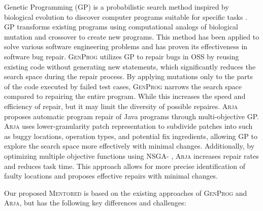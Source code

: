 \documentclass[10pt,conference]{IEEEtran}
\begin{document}
        Genetic Programming (GP) is a probabilistic search method inspired by biological evolution to discover computer programs suitable for specific tasks \cite{forrest1993genetic, koza1992programming}. GP transforms existing programs using computational analogs of biological mutation and crossover to create new programs. This method has been applied to solve various software engineering problems and has proven its effectiveness in software bug repair. \textsc{GenProg} \cite{le2011genprog} utilizes GP to repair bugs in OSS by reusing existing code without generating new statements, which significantly reduces the search space during the repair process. By applying mutations only to the parts of the code executed by failed test cases, \textsc{GenProg} narrows the search space compared to repairing the entire program. While this increases the speed and efficiency of repair, but it may limit the diversity of possible repaires. \textsc{Arja} \cite{yuan2018arja} proposes automatic program repair of Java programs through multi-objective GP. \textsc{Arja} uses lower-granularity patch representation \cite{oliveira2016improved} to subdivide patches into such as buggy locations, operation types, and potential fix ingredients, allowing GP to explore the search space more effectively with minimal changes. Additionally, by optimizing multiple objective functions using NSGA-\uppercase\expandafter{} \cite{deb2002fast}, \textsc{Arja} increases repair rates and reduces task time. This approach allows for more precise identification of faulty locations and proposes effective repairs with minimal changes.

        Our proposed \textsc{Mentored} is based on the existing approaches of \textsc{GenProg} and \textsc{Arja}, but has the following key differences and challenges:
\end{document}
